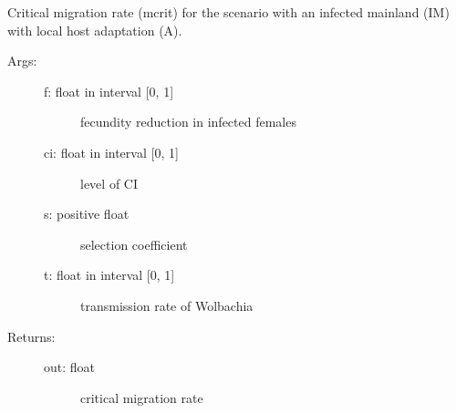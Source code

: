 \documentclass[letterpaper,10pt,english]{sphinxmanual}
\begin{document}
\begin{fulllineitems}
\label{index:wspec.analytical.mcrit_IMA}
Critical migration rate (mcrit) for the scenario with an infected 
mainland (IM) with local host adaptation (A).
\begin{description}
\item[{Args:}] \leavevmode\begin{description}
\item[{f: float in interval {[}0, 1{]}}] \leavevmode
fecundity reduction in infected females

\item[{ci: float in interval {[}0, 1{]}}] \leavevmode
level of CI

\item[{s: positive float}] \leavevmode
selection coefficient

\item[{t: float in interval {[}0, 1{]}}] \leavevmode
transmission rate of Wolbachia

\end{description}

\item[{Returns:}] \leavevmode\begin{description}
\item[{out: float}] \leavevmode
critical migration rate

\end{description}

\end{description}

\end{fulllineitems}

\end{document}
